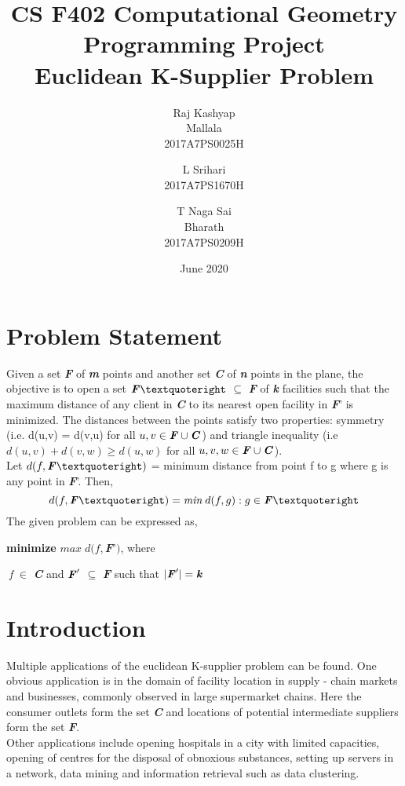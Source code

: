 \documentclass[12pt, a4paper]{article}
\title{%
 \LARGE        CS F402 Computational Geometry
\newline
\newline
\LARGE Programming Project\\
\Large Euclidean K-Supplier Problem
}
\author{%
 \begin{tabular}{c} \small Raj Kashyap\\ \small Mallala\\ \small2017A7PS0025H \end{tabular}\and
 \begin{tabular}{c} \small L Srihari\\ \small2017A7PS1670H \end{tabular}\and
 \begin{tabular}{c}\small T Naga Sai\\ \small Bharath\\ \small2017A7PS0209H \end{tabular}
}
\date{June 2020}
\begin{document}
\maketitle
\section{Problem Statement}
Given a set \textbf{\textit{F}} of \textbf{\textit{m}} points and another set \textbf{\textit{C}} of \textbf{\textit{n}} points in the plane, the objective is to open a set $\textbf{\textit{F}}’$ $\subseteq$ \textbf{\textit{F}} of \textbf{\textit{k}} facilities such that the maximum distance of any client in \textbf{\textit{C}} to its nearest open facility in \textbf{\textit{F}}’ is minimized. The distances between the points satisfy two properties: symmetry (i.e. d(u,v) = d(v,u) for all $u,v \in \textbf{\textit{F}} \cup \textbf{\textit{C}}$) and triangle inequality (i.e $d(u,v)+d(v,w) \geq d(u,w)$ for all $u,v,w  \in \textbf{\textit{F}} \cup \textbf{\textit{C}}$).\\

Let $d(f,\textbf{\textit{F}}’)$ = minimum distance from point f to g where g is any point in  \textbf{\textit{F}}'. Then,
\begin{equation} d(f,\textbf{\textit{F}}’) = \emph{min}\;d(f,g) : g \in \textbf{\textit{F}}’\end{equation}
The given problem can be expressed as,\begin{center}\textbf{minimize} $max\;d(f,$\textbf{\textit{F}}’$)$, where\end{center}
$\;$\textit{f} $\in$  \textbf{\textit{C}} and $\textbf{\textit{F}}'$ $\subseteq$ \textbf{\textit{F}} such that $| \textbf{\textit{F}}' | = \textbf{\textit{k}}$\\

\section{Introduction}
Multiple applications of the euclidean K-supplier problem can be found. One obvious application is in the domain of facility location in supply - chain markets and businesses, commonly observed in large supermarket chains. Here the consumer outlets form the set \textbf{\textit{C}} and locations of potential intermediate suppliers form the set  \textbf{\textit{F}}.\\
Other applications include opening hospitals in a city with limited capacities, opening of centres for the disposal of obnoxious substances, setting up servers in a network, data mining and information retrieval such as data clustering.\\
\end{document}
